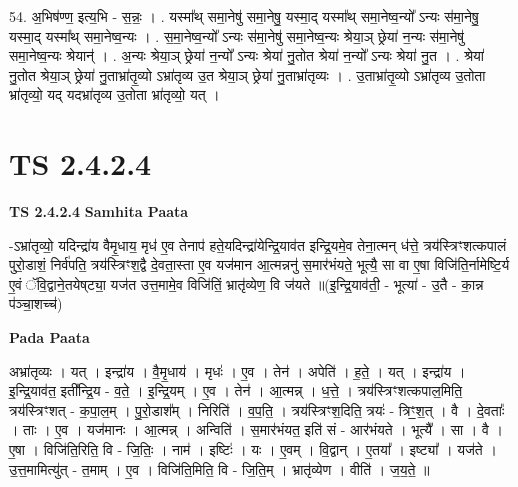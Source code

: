\documentclass[17pt]{extarticle}
\begin{document}
54. अ॒भिष॑ण्ण॒ इत्य॒भि - स॒न्नः॒ । . यस्मा᳚थ् समा॒नेषु॑ समा॒नेषु॒ यस्मा॒द् यस्मा᳚थ् समा॒नेष्व॒न्यो᳚ ऽन्यः स॑मा॒नेषु॒ यस्मा॒द् यस्मा᳚थ् समा॒नेष्व॒न्यः । . स॒मा॒नेष्व॒न्यो᳚ ऽन्यः स॑मा॒नेषु॑ समा॒नेष्व॒न्यः श्रेया॒ञ् छ्रेया॑ न॒न्यः स॑मा॒नेषु॑ समा॒नेष्व॒न्यः श्रेयान्॑ । . अ॒न्यः श्रेया॒ञ् छ्रेया॑ न॒न्यो᳚ ऽन्यः श्रेया॑ नु॒तोत श्रेया॑ न॒न्यो᳚ ऽन्यः श्रेया॑ नु॒त । . श्रेया॑ नु॒तोत श्रेया॒ञ् छ्रेया॑ नु॒ताभ्रा॑तृ॒व्यो ऽभ्रा॑तृव्य उ॒त श्रेया॒ञ् छ्रेया॑ नु॒ताभ्रा॑तृव्यः । . उ॒ताभ्रा॑तृ॒व्यो ऽभ्रा॑तृव्य उ॒तोता भ्रा॑तृव्यो॒ यद् यदभ्रा॑तृव्य उ॒तोता भ्रा॑तृव्यो॒ यत् । \newline
\pagebreak
{}

\section{ TS 2.4.2.4 }

\textbf{TS 2.4.2.4 } \newline
\textbf{Samhita Paata} \newline

-ऽभ्रा॑तृव्यो॒ यदिन्द्रा॑य वैमृ॒धाय॒ मृध॑ ए॒व तेनाप॑ हते॒यदिन्द्रा॑येन्द्रि॒याव॑त इन्द्रि॒यमे॒व तेना॒त्मन् ध॑त्ते॒ त्रय॑स्त्रिꣳशत्कपालं पुरो॒डाशं॒ निर्व॑पति॒ त्रय॑स्त्रिꣳश॒द्वै दे॒वता॒स्ता ए॒व यज॑मान आ॒त्मन्ननु॑ स॒मार॑भंयते॒ भूत्यै॒ सा वा ए॒षा विजि॑ति॒र्नामेष्टि॒र्य ए॒वं ॅवि॒द्वाने॒तयेष्‌ट्या॒ यज॑त उत्त॒मामे॒व विजि॑तिं॒ भ्रातृ॑व्येण॒ वि ज॑यते ॥(इ॒न्द्रि॒याव॑ती॒ - भूत्या॑ - उ॒तै - का॒न्न प॑ञ्चा॒शच्च॑) \newline

\textbf{Pada Paata} \newline

अभ्रा॑तृव्यः । यत् । इन्द्रा॑य । वै॒मृ॒धाय॑ । मृधः॑ । ए॒व । तेन॑ । अपेति॑ । ह॒ते॒ । यत् । इन्द्रा॑य । इ॒न्द्रि॒याव॑त॒ इती᳚न्द्रि॒य - व॒ते॒ । इ॒न्द्रि॒यम् । ए॒व । तेन॑ । आ॒त्मन्न् । ध॒त्ते॒ । त्रय॑स्त्रिꣳशत्कपाल॒मिति॒ त्रय॑स्त्रिꣳशत् - क॒पा॒ल॒म् । पु॒रो॒डाश᳚म् । निरिति॑ । व॒प॒ति॒ । त्रय॑स्त्रिꣳश॒दिति॒ त्रयः॑ - त्रिꣳ॒॒श॒त् । वै । दे॒वताः᳚ । ताः । ए॒व । यज॑मानः । आ॒त्मन्न् । अन्विति॑ । स॒मार॑भंयत॒ इति॑ सं - आर॑भंयते । भूत्यै᳚ । सा । वै । ए॒षा । विजि॑ति॒रिति॒ वि - जि॒तिः॒ । नाम॑ । इष्टिः॑ । यः । ए॒वम् । वि॒द्वान् । ए॒तया᳚ । इष्ट्या᳚ । यज॑ते । उ॒त्त॒मामित्यु॑त् - त॒माम् । ए॒व । विजि॑ति॒मिति॒ वि - जि॒ति॒म् । भ्रातृ॑व्येण । वीति॑ । ज॒य॒ते॒ ॥  \newline
\end{document}
